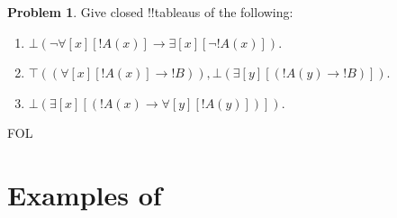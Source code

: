 \documentclass[10pt,a4paper]{article}
\theoremstyle{plain}
\theoremstyle{definition}
\newtheorem{prob}{Problem}[section]
\theoremstyle{remark}
\newcommand*{\olfileid}[3]{}
\newcommand*{\olsection}[1]{\section*{#1}}
\providecommand{\lif}{\mathbin{\rightarrow}}
\providecommand{\lforall}{\mathord{\forall}}
\providecommand{\lexists}{\mathord{\exists}}
\providecommand{\sFmla}[2]{#1(#2)}
\providecommand{\True}{\top}
\providecommand{\False}{\bot}
\providecommand{\iftag}[1]{#1}
\begin{document}
\begin{prob}
Give closed !!{tableau}s of the following:
\begin{enumerate}
\item $\sFmla{\False}{\lnot\lforall[x][!A(x)] \lif \lexists[x][\lnot!A(x)]}$.
\item $\sFmla{\True}{(\lforall[x][!A(x)] \lif !B)}, \sFmla{\False}{\lexists[y][(!A(y) \lif !B)]}$.
\item $\sFmla{\False}{\lexists[x][(!A(x) \lif \lforall[y][!A(y)])]}$.
\end{enumerate}
\end{prob}





\iftag{FOL}
      {\olfileid{fol}{tab}{pro}}
      {\olfileid{pl}{tab}{pro}}

\olsection{Examples of }
\end{document}
